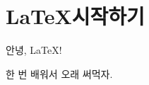 \documentclass[oneside, a4paper]{article}
\begin{document}
\section[시작]{\LaTeX 시작하기}
\begin{center}
  안녕, \LaTeX!
\end{center}
한 번 배워서 오래 써먹자.
\end{document}
